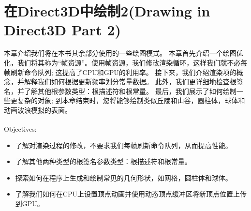 \chapter{在Direct3D中绘制2(Drawing in Direct3D Part 2)}
\begin{flushleft}
本章介绍我们将在本书其余部分使用的一些绘图模式。 本章首先介绍一个绘图优化，我们将其称为“帧资源”。使用帧资源，我们修改渲染循环，这样我们就不必每帧刷新命令队列; 这提高了CPU和GPU的利用率。 接下来，我们介绍渲染项的概念，并解释我们如何根据更新频率划分常量数据。 此外，我们更详细地检查根签名，并了解其他根参数类型：根描述符和根常量。 最后，我们展示了如何绘制一些更复杂的对象; 到本章结束时，您将能够绘制类似丘陵和山谷，圆柱体，球体和动画波浪模拟的表面。\\
~\\
{\large Objectives:}
\begin{itemize}
    \item 了解对渲染过程的修改，不要求我们每帧刷新命令队列，从而提高性能。
    \item 了解其他两种类型的根签名参数类型：根描述符和根常量。
    \item 探索如何在程序上生成和绘制常见的几何形状，如网格，圆柱体和球体。
    \item 了解我们如何在CPU上设置顶点动画并使用动态顶点缓冲区将新顶点位置上传到GPU。
\end{itemize}
\end{flushleft}

